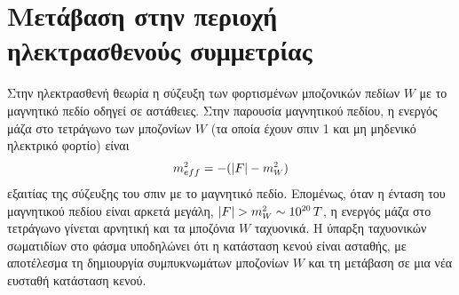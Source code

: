 \section{Μετάβαση στην περιοχή ηλεκτρασθενούς συμμετρίας}
Στην ηλεκτρασθενή θεωρία 
η σύζευξη των φορτισμένων μποζονικών πεδίων $W$ με το μαγνητικό πεδίο 
οδηγεί σε αστάθειες. Στην παρουσία μαγνητικού πεδίου, η ενεργός μάζα στο τετράγωνο των μποζονίων $W$ (τα οποία έχουν σπιν 1 και μη μηδενικό ηλεκτρικό φορτίο) είναι \cite{AMBJORN1990193,ambjornTheoryAndApplications} 
\begin{equation}
    m\superscr{2}_{eff}= -(|F|-m\subscr{W}\superscr{2})
\end{equation}
εξαιτίας της σύζευξης του σπιν με το μαγνητικό πεδίο.
Επομένως, όταν η ένταση του μαγνητικού πεδίου είναι αρκετά μεγάλη, $|F|> m\subscr{W}\superscr{2}\sim \text{10}\superscr{20}\,T$, 
η ενεργός μάζα στο τετράγωνο γίνεται αρνητική
και τα μποζόνια $W$ ταχυονικά. Η ύπαρξη ταχυονικών σωματιδίων στο φάσμα υποδηλώνει ότι η κατάσταση κενού είναι ασταθής, με αποτέλεσμα τη δημιουργία συμπυκνωμάτων μποζονίων $W$ και τη μετάβαση σε μια νέα ευσταθή κατάσταση κενού.\\

